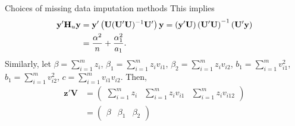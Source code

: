 \begin{frame}{Choices of missing data imputation methods}
This implies 
    \begin{align}\label{yHuy}
        \mathbf{y}'\mathbf{H}_u \mathbf{y} &=  \mathbf{y}'\left(\mathbf{U}(\mathbf{U}'\mathbf{U})^{-1}\mathbf{U}'\right) \mathbf{y}
        = \left(\mathbf{y}'\mathbf{U}\right)\left(\mathbf{U}'\mathbf{U}\right)^{-1} \left(\mathbf{U}'\mathbf{y}\right) \notag\\
        &= \frac{\alpha^2}{n} + \frac{\alpha_1^2}{a_1}.
    \end{align}
Similarly, let $\beta = \sum\limits_{i=1}^m z_i$, $\beta_1 = \sum\limits_{i=1}^m z_iv_{i1}$, $\beta_2 = \sum\limits_{i=1}^m z_iv_{i2}$, $b_1=\sum\limits_{i=1}^m v_{i1}^2$,
$b_1=\sum\limits_{i=1}^m v_{i2}^2$,
$c=\sum\limits_{i=1}^m v_{i1}v_{i2}$. Then, 
\begin{align*}
        \mathbf{z}'\mathbf{V} &= \begin{pmatrix}
            \sum\limits_{i=1}^m z_i & \sum\limits_{i=1}^m z_iv_{i1} & \sum\limits_{i=1}^mz_iv_{i12}
        \end{pmatrix}\\
        &= \begin{pmatrix}
            \beta & \beta_1 & \beta_2
        \end{pmatrix}
            \end{align*}
\end{frame}
